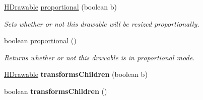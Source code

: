 \begin{DoxyCompactItemize}
\hyperlink{classhype_1_1core_1_1drawable_1_1_h_drawable}{H\-Drawable} \hyperlink{classhype_1_1core_1_1drawable_1_1_h_drawable_ae4497942c7fbf1112bb8e557ec72aad8}{proportional} (boolean b)
\begin{DoxyCompactList}\small\item\em Sets whether or not this drawable will be resized proportionally. \end{DoxyCompactList}\item 
boolean \hyperlink{classhype_1_1core_1_1drawable_1_1_h_drawable_a220999f7d54e04a47ad0509d349a2bdd}{proportional} ()
\begin{DoxyCompactList}\small\item\em Returns whether or not this drawable is in proportional mode. \end{DoxyCompactList}\item 
\hypertarget{classhype_1_1core_1_1drawable_1_1_h_drawable_ad3732f860b758f7cdd3b054c6316bb63}{\hyperlink{classhype_1_1core_1_1drawable_1_1_h_drawable}{H\-Drawable} {\bfseries transforms\-Children} (boolean b)}\label{classhype_1_1core_1_1drawable_1_1_h_drawable_ad3732f860b758f7cdd3b054c6316bb63}

\item 
\hypertarget{classhype_1_1core_1_1drawable_1_1_h_drawable_a15ac4680ab74bf0204aaf6386745f5fd}{boolean {\bfseries transforms\-Children} ()}\label{classhype_1_1core_1_1drawable_1_1_h_drawable_a15ac4680ab74bf0204aaf6386745f5fd}


\end{DoxyCompactItemize}
